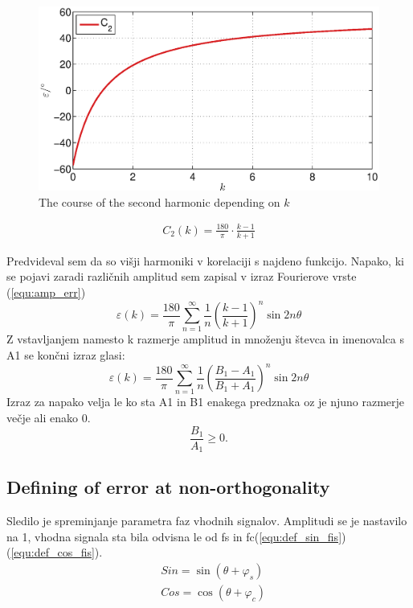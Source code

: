 \documentclass[a4paper]{article}
\begin{document}
\begin{figure}[!htb]
	\begin{center}
		\includegraphics[width=\linewidth]{./Slike/amp.eps}
		\caption{The course of the second harmonic depending on $k$} \label{fig:amp}
	\end{center}
\end{figure}
\begin{eqnarray}
\label{equ:drugi_har}
C_2(k)=\frac{180}{\pi}\cdot\frac{k-1}{k+1}
\end{eqnarray}

Predvideval sem da so višji harmoniki v korelaciji s najdeno funkcijo. Napako, ki se pojavi zaradi različnih amplitud sem zapisal v izraz  Fourierove vrste (\ref{equ:amp_err})
\begin{equation}
\label{equ:amp_err}
\varepsilon(k) =\frac{180}{\pi}\sum_{n=1}^{\infty}\frac{1}{n}(\frac{k-1}{k+1})^n \sin 2 n \theta
\end{equation}
Z vstavljanjem namesto k razmerje amplitud in množenju števca in imenovalca s A1 se končni izraz glasi:
\begin{equation}
\label{equ:amp_err2}
\varepsilon(k) =\frac{180}{\pi}\sum_{n=1}^{\infty}\frac{1}{n}(\frac{B_1-A_1}{B_1+A_1})^n \sin 2 n \theta
\end{equation}
Izraz za napako velja le ko sta A1 in B1 enakega predznaka oz je njuno razmerje večje ali enako 0.
 $$\frac{B_1}{A_1} \geq 0.$$

\subsection{Defining of error at non-orthogonality}
Sledilo je spreminjanje parametra faz vhodnih signalov. Amplitudi se je nastavilo na 1, vhodna signala sta bila odvisna le od fs in fc(\ref{equ:def_sin_fis})(\ref{equ:def_cos_fis}).
\begin{eqnarray}
\label{equ:def_sin_fis}
&Sin = \sin(\theta + \varphi_{s})\\
\label{equ:def_cos_fis}
&Cos =\cos(\theta+\varphi_{c})
\end{eqnarray}
\end{document}
